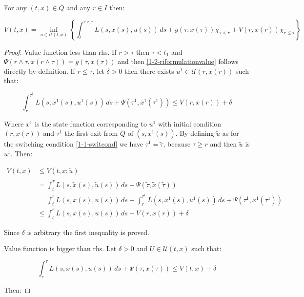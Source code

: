 \begin{proposition}\label{1-2-propriformulation}
    For any $(t,x)\in\overline{Q}$ and any $r\in I$ then:

    \begin{equation}\label{1-2-riformulationvalue}
        V(t,x)=\inf_{u\in\mathcal{U}(t,x)}\left\{\int_t^{r\land\tau}L(s,x(s),u(s))\,ds+g(\tau,x(\tau))\chi_{\tau<r}+V(r,x(r))\chi_{r\leq\tau}\right\}
    \end{equation}

    \begin{proof}
        Value function less than rhs. If $r>\tau$ then $\tau<t_1$ and $\Psi(r\land\tau,x(r\land\tau))=g(\tau,x(\tau))$ and then \ref*{1-2-riformulationvalue}
        follows directly by definition. If $r\leq\tau$, let $\delta>0$ then there exists $u^1\in\mathcal{U}(r,x(r))$ such that:

        \[\int_r^{\tau^1}L(s,x^1(s),u^1(s))\,ds+\Psi(\tau^1,x^1(\tau^1))\leq V(r,x(r))+\delta\]

        Where $x^1$ is the state function corresponding to $u^1$ with initial condition $(r,x(r))$ and $\tau^1$ the first exit from $\overline{Q}$ of $(s,x^1(s))$.  
        By defining $\tilde{u}$ as for the switching condition \ref{1-1-switcond} we have $\tau^1=\tilde{\tau}$, because $\tau\geq r$ and then $\tilde{u}$ is $u^1$. Then:
        
        \begin{align*}
            V(t,x) & \leq V(t,x;\tilde{u}) \\
            & = \int_t^{\tilde{\tau}} L(s,\tilde{x}(s),\tilde{u}(s))\,ds+\Psi(\tilde{\tau},\tilde{x}(\tilde{\tau})) \\
            & = \int_t^{r} L(s,x(s),u(s))\,ds+\int_r^{\tau^1} L(s,x^1(s),u^1(s))\,ds+\Psi(\tau^1,x^1(\tau^1)) \\
            & \leq \int_t^{r} L(s,x(s),u(s))\,ds + V(r,x(r)) + \delta
        \end{align*}

    Since $\delta$ is arbitrary the first inequality is proved.
    
    \noindent Value function is bigger than rhs. Let $\delta>0$ and $U\in\mathcal{U}(t,x)$ such that:

    \[\int_r^{\tau}L(s,x(s),u(s))\,ds+\Psi(\tau,x(\tau))\leq V(t,x)+\delta\]

    Then: 


\end{proof}
\end{proposition}
